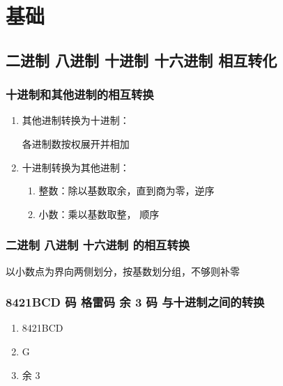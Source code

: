 \chapter{基础}
\newpage

\section{二进制 八进制 十进制 十六进制 相互转化}

\subsection{十进制和其他进制的相互转换}

\begin{enumerate}

\item 其他进制转换为十进制：

各进制数按权展开并相加

\item 十进制转换为其他进制：

\begin{enumerate}

    \item 整数：除以基数取余，直到商为零，逆序
    \item 小数：乘以基数取整， 顺序

\end{enumerate}

\end{enumerate}

\newpage

\subsection{二进制 八进制 十六进制 的相互转换}
\newpage

以小数点为界向两侧划分，按基数划分组，不够则补零

\subsection{8421BCD 码 格雷码 余 3 码 与十进制之间的转换}

\begin{enumerate}

    \item 8421BCD
    \item G
    \item 余 3

\end{enumerate}

